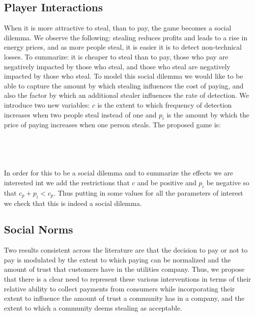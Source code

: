 \documentclass{article}
\begin{document}
\subsection{Player Interactions}
When it is more attractive to steal, than to pay, the game becomes a social dilemma. We observe the following: stealing reduces profits and leads to a rise in energy prices, and as more people steal, it is easier it is to detect non-technical losses. To summarize: it is cheaper to steal than to pay, those who pay are negatively impacted by those who steal, and those who steal are negatively impacted by those who steal. To model this social dilemma we would like to be able to capture the amount by which stealing influences the cost of paying, and also the factor by which an additional stealer influences the rate of detection. We introduce two new variables: $c$ is the extent to which frequency of detection increases when two people steal instead of one and $p_i$ is the amount by which the price of paying increases when one person steals. The proposed game is:\\ \\
\\
                  \\
                  \\
In order for this to be a social dilemma and to summarize the effects we are interested int we add the restrictions that $c$ and be positive and  $p_i$ be negative so that $c_p + p_i < c_p$. Thus putting in some values for all the parameters of interest we check that this is indeed a social dilemma. 


\subsection{Social Norms}
Two results consistent across the literature are that the decision to pay or not to pay is modulated by the extent to which paying can be normalized and the amount of trust that customers have in the utilities company. Thus, we propose that there is a clear need to represent these various interventions in terms of their relative ability to collect payments from consumers while incorporating their extent to influence the amount of trust a community has in a company, and the extent to which a community deems stealing as acceptable.
\end{document}
